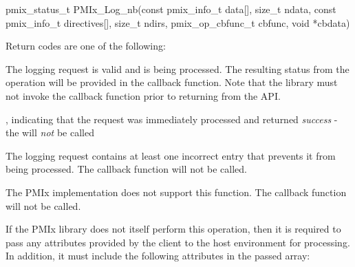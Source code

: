 \format

\cspecificstart
\begin{codepar}
pmix_status_t
PMIx_Log_nb(const pmix_info_t data[], size_t ndata,
            const pmix_info_t directives[], size_t ndirs,
            pmix_op_cbfunc_t cbfunc, void *cbdata)
\end{codepar}
\cspecificend

\begin{arglist}
\end{arglist}

Return codes are one of the following:

\begin{constantdesc}
\item {} The logging request is valid and is being processed. The resulting status from the operation will be provided in the callback function. Note that the library must not invoke the callback function prior to returning from the \ac{API}.
\item {}, indicating that the request was immediately processed and returned \textit{success} - the  will \textit{not} be called
\item {} The logging request contains at least one incorrect entry that prevents it from being processed. The callback function will not be called.
\item {} The \ac{PMIx} implementation does not support this function. The callback function will not be called.
\end{constantdesc}

\reqattrstart
If the \ac{PMIx} library does not itself perform this operation, then it is required to pass any attributes provided by the client to the host environment for processing. In addition, it must include the following attributes in the passed  array:


